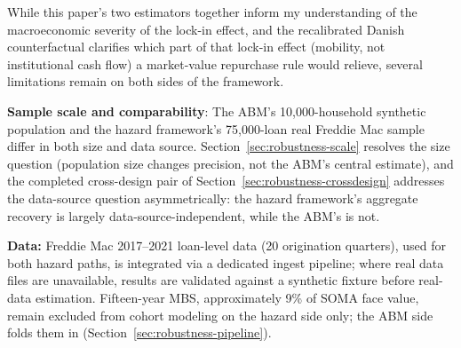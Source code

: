 \documentclass[12pt]{article}
\begin{document}
While this paper's two estimators together inform my understanding of the macroeconomic severity of the lock-in effect, and the recalibrated Danish counterfactual clarifies which part of that lock-in effect (mobility, not institutional cash flow) a market-value repurchase rule would relieve, several limitations remain on both sides of the framework.

\textbf{Sample scale and comparability}: The ABM's 10,000-household synthetic population and the hazard framework's 75,000-loan real Freddie Mac sample differ in both size and data source. Section~\ref{sec:robustness-scale} resolves the size question (population size changes precision, not the ABM's central estimate), and the completed cross-design pair of Section~\ref{sec:robustness-crossdesign} addresses the data-source question asymmetrically: the hazard framework's aggregate recovery is largely data-source-independent, while the ABM's is not.

\textbf{Data:} Freddie Mac 2017--2021 loan-level data (20 origination quarters), used for both hazard paths, is integrated via a dedicated ingest pipeline; where real data files are unavailable, results are validated against a synthetic fixture before real-data estimation. Fifteen-year MBS, approximately 9\% of SOMA face value, remain excluded from cohort modeling on the hazard side only; the ABM side folds them in (Section~\ref{sec:robustness-pipeline}).
\end{document}
